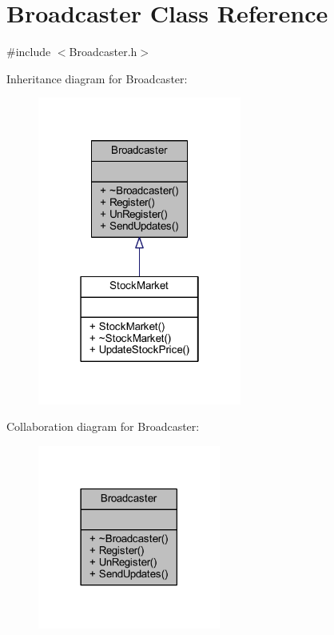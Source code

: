 \hypertarget{class_broadcaster}{}\section{Broadcaster Class Reference}
\label{class_broadcaster}


{\ttfamily \#include $<$Broadcaster.\+h$>$}



Inheritance diagram for Broadcaster\+:
\nopagebreak
\begin{figure}[H]
\begin{center}
\leavevmode
\includegraphics[width=190pt]{class_broadcaster__inherit__graph}
\end{center}
\end{figure}


Collaboration diagram for Broadcaster\+:
\nopagebreak
\begin{figure}[H]
\begin{center}
\leavevmode
\includegraphics[width=170pt]{class_broadcaster__coll__graph}
\end{center}
\end{figure}
